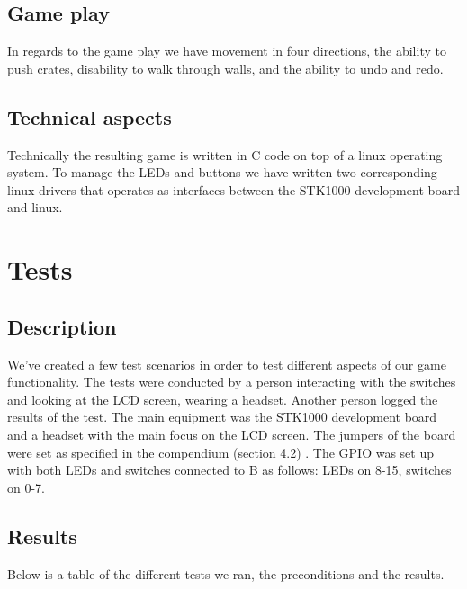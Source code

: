 \documentclass[a4paper,11pt]{article}
\begin{document}
\subsection{Game play}
In regards to the game play we have movement in four directions, the ability to push crates, disability to walk through walls, and the ability to undo and redo. 

\subsection{Technical aspects}Technically the resulting game is written in C code on top of a linux operating system. To manage the LEDs and buttons we have written two corresponding linux drivers that operates as interfaces between the STK1000 development board and linux. 

\section{Tests}
\subsection{Description}

We've created a few test scenarios in order to test different aspects of our game functionality. The tests were conducted by a person interacting with the switches and looking at the LCD screen, wearing a headset. Another person logged the results of the test. The main equipment was the STK1000 development board and a headset with the main focus on the LCD screen. The jumpers of the board were set as specified in the compendium (section 4.2) \cite{komp}. The GPIO was set up with both LEDs and switches connected to B as follows: LEDs on 8-15, switches on 0-7. 

\subsection{Results}
Below is a table of the different tests we ran, the preconditions and the results. 
\end{document}

